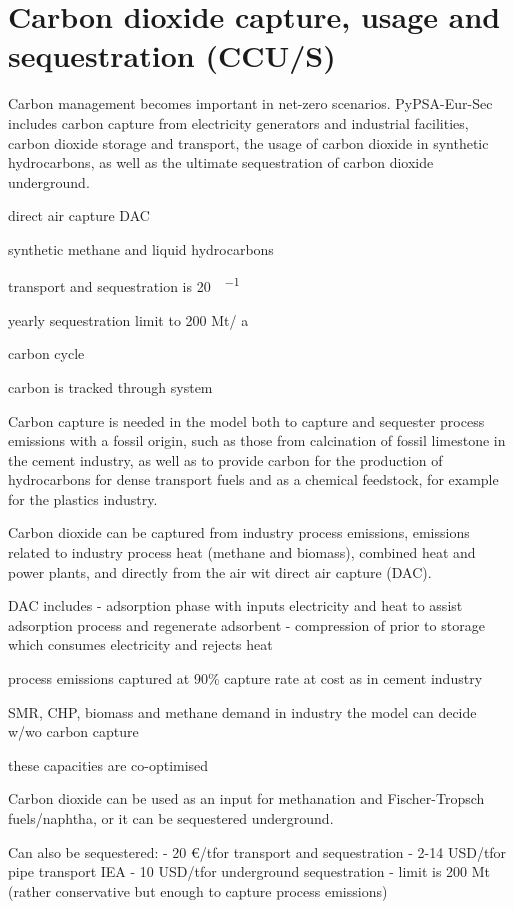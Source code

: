 \section{Carbon dioxide capture, usage and sequestration (CCU/S)}
\label{sec:si:carbon-management}

Carbon management becomes important in net-zero scenarios. PyPSA-Eur-Sec
includes carbon capture from electricity generators and industrial facilities,
carbon dioxide storage and transport, the usage of carbon dioxide in synthetic
hydrocarbons, as well as the ultimate sequestration of carbon dioxide
underground.


direct air capture DAC

synthetic methane and liquid hydrocarbons

transport and sequestration is \SI{20}{\sieuro\per\tco}

yearly sequestration limit to 200 Mt\co / a

carbon cycle

carbon is tracked through system

Carbon capture is needed in the model both to capture and sequester process
emissions with a fossil origin, such as those from calcination of fossil
limestone in the cement industry, as well as to provide carbon for the
production of hydrocarbons for dense transport fuels and as a chemical
feedstock, for example for the plastics industry.

Carbon dioxide can be captured from industry process emissions, emissions
related to industry process heat (methane and biomass), combined heat and power plants, and directly
from the air wit direct air capture (DAC).

DAC includes
- adsorption phase with inputs electricity and heat to assist adsorption process and regenerate adsorbent
- compression of \co prior to storage which consumes electricity and rejects heat

process emissions captured at 90\% capture rate at cost as in cement industry

SMR, CHP, biomass and methane demand in industry the model can decide w/wo carbon capture

these capacities are co-optimised

Carbon dioxide can be used as an input for methanation and Fischer-Tropsch
fuels/naphtha, or it can be sequestered underground.

Can also be sequestered:
- 20 \euro/t\co for transport and sequestration
- 2-14 USD/t\co for pipe transport IEA
- 10 USD/t\co for underground sequestration
- limit is 200 Mt (rather conservative but enough to capture process emissions)

